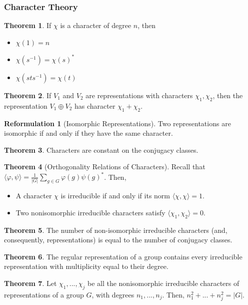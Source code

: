 \documentclass{article}
\theoremstyle{definition}
\newtheorem{reformulation}{Reformulation}[subsection]
\newtheorem{theorem}{Theorem}[subsection]
\begin{document}
\subsubsection*{Character Theory}
\begin{theorem}
    If $\chi$ is a character of degree $n$, then
    \begin{itemize}
        \item $\chi(1)=n$
        \item $\chi(s^{-1})=\chi(s)^*$
        \item $\chi(sts^{-1})=\chi(t)$
    \end{itemize}
\end{theorem}
\begin{theorem}
    If $V_1$ and $V_2$ are representations with characters $\chi_1, \chi_2$, then the representation $V_1\oplus V_2$ has character $\chi_1+\chi_2$.
\end{theorem}
\begin{reformulation}[Isomorphic Representations]
    Two representations are isomorphic if and only if they have the same character.
\end{reformulation}
\begin{theorem}
    Characters are constant on the conjugacy classes.
\end{theorem}
\begin{theorem}[Orthogonality Relations of Characters]
    Recall that $\langle \varphi, \psi \rangle= \frac1{|G|}\sum_{g\in G}^{} \varphi(g)\psi(g)^*$. Then, 
    \begin{itemize}
        \item A character $\chi$ is irreducible if and only if its norm $\langle \chi, \chi \rangle =1$.
        \item Two nonisomorphic irreducible characters satisfy $\langle \chi_1,\chi_2 \rangle=0$. 
    \end{itemize}
\end{theorem}
\begin{theorem}
    The number of non-isomorphic irreducible characters (and, consequently, representations) is equal to the number of conjugacy classes.
\end{theorem}
\begin{theorem}
    The regular representation of a group contains every irreducible representation with multiplicity equal to their degree.
\end{theorem}
\begin{theorem}
    Let $\chi_1,...,\chi_j$ be all the nonisomorphic irreducible characters of representations of a group $G$, with degrees $n_1,...,n_j$. Then, $n_1^2+...+n_j^2=|G|$.
\end{theorem}
\end{document}
